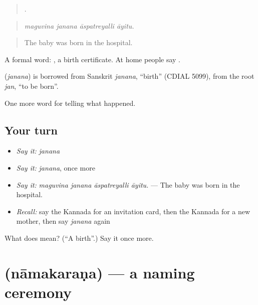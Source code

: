 \begin{quote}
   .
\end{quote}

\begin{quote}
\emph{maguvina janana āspatreyalli āyitu.}
\end{quote}

\begin{quote}
The baby was born in the hospital.
\end{quote}

A formal word:  , a birth certificate. At home people say .

\begin{cousinweb}
\textbf{} (\emph{janana}) is borrowed from Sanskrit \emph{janana}, \textquotedblleft{}birth\textquotedblright{} (CDIAL 5099), from the root \emph{jan}, \textquotedblleft{}to be born\textquotedblright{}.
\end{cousinweb}

\begin{grammarlens}[title={What you've built}]
One more word for telling what happened.
\end{grammarlens}

\subsection*{Your turn}
\begin{itemize}
\raggedright
  \item \emph{Say it:} \emph{janana}
  \item \emph{Say it:} \emph{janana}, once more
  \item \emph{Say it:} \emph{maguvina janana āspatreyalli āyitu.} — The baby was born in the hospital.
  \item \emph{Recall:} say the Kannada for an invitation card, then the Kannada for a new mother, then say \emph{janana} again
\end{itemize}

\begin{tcolorbox}[breakable,colback=teal!4,colframe=teal!35!black,title={Before you move on}]
What does  mean? (\textquotedblleft{}A birth\textquotedblright{}.) Say it once more.
\end{tcolorbox}
\section[\texorpdfstring{\kn{ನಾಮಕರಣ} (nāmakaraṇa)}{ನಾಮಕರಣ (nāmakaraṇa)}]{ (nāmakaraṇa) — a naming ceremony}

